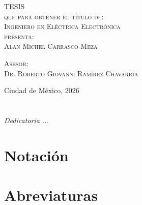 \documentclass[letterpaper,12pt,oneside]{book}
\begin{document}
\begin{titlepage}
\begin{minipage}[c][0.81\textheight][t]{0.75\textwidth}
\begin{center}
                \vspace{2cm}            

                \textsc{\LARGE T\hspace{1.5cm}E\hspace{1.5cm}S\hspace{1.5cm}I\hspace{1.5cm}S}\\[0.5cm]
                \textsc{\large que para obtener el título de:}\\[0.5cm]
                \textsc{\large Ingeniero en Eléctrica Electrónica}\\[0.5cm]
                \textsc{\large presenta:}\\[0.5cm]
                \textsc{\large {Alan Michel Carrasco Meza}}\\[2cm]          

                \vspace{0.5cm}

                {\large\scshape Asesor:\\[0.3cm] {Dr. Roberto Giovanni Ramírez Chavarría}}\\[.2in]

                \vspace{0.5cm}

                \large{Ciudad de México, }{2026}
            \end{center}
        \end{minipage}
    \end{titlepage}



\frontmatter
\chapter*{}
\begin{flushright}%
\emph{Dedicatoria ...}
  
\thispagestyle{empty}
\end{flushright}

%

\chapter{Notación}

\chapter{Abreviaturas}
\end{document}
